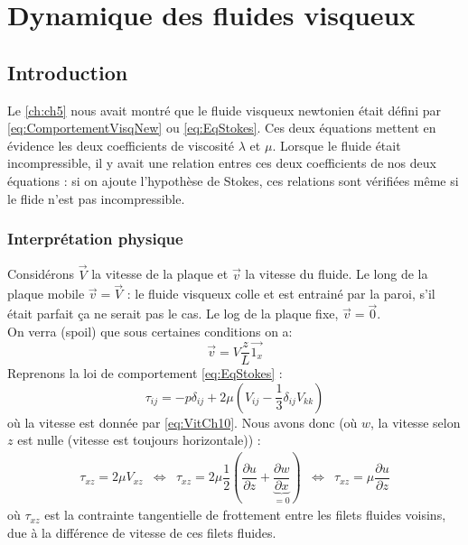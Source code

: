 \chapter{Dynamique des fluides visqueux}
\section{Introduction}
Le \autoref{ch:ch5} nous avait montré que le fluide visqueux newtonien était défini par \autoref{eq:ComportementVisqNew} ou \autoref{eq:EqStokes}. Ces deux équations mettent 
en évidence les deux coefficients de viscosité $\lambda$ et $\mu$. Lorsque le fluide 
était incompressible, il y avait une relation entres ces deux coefficients de nos deux
équations : si on ajoute l'hypothèse de Stokes, ces relations sont vérifiées même si le
flide n'est pas incompressible.


\subsection{Interprétation physique}
Considérons $\vec{V}$ la vitesse de la plaque et $\vec{v}$ la vitesse du fluide. Le
long de la plaque mobile $\vec{v}=\vec{V}$ : le fluide visqueux colle et est entrainé
par la paroi, s'il était parfait ça ne serait pas le cas. Le log de la plaque fixe,
$\vec{v}=\vec{0}$.\\
	
On verra (spoil) que sous certaines conditions on a: 
\begin{equation}
	\vec{v} = V\frac{z}{L}\vec{1_x}
	\label{eq:VitCh10}
\end{equation}
Reprenons la loi de comportement \autoref{eq:EqStokes} :
\begin{equation}
	\tau_{ij} = -p\delta_{ij} + 2\mu\left(V_{ij} - \frac{1}{3}\delta_{ij}V_{kk}\right)
\end{equation}
où la vitesse est donnée par \autoref{eq:VitCh10}. Nous avons donc (où $w$, la vitesse
selon $z$ est nulle (vitesse est toujours horizontale)) :
\begin{equation}
	\begin{array}{ccccc}
		\tau_{xz} = 2\mu V_{xz} & \Leftrightarrow & \tau_{xz} = 2\mu\dfrac{1}{2}\left(\dfrac{ 
		\partial u}{\partial z}+\underbrace{\dfrac{\partial w}{\partial x}}_{=0}\right) &
		\Leftrightarrow & \tau_{xz}	= \mu \dfrac{\partial u}{\partial z}
	\end{array}
\end{equation}
où $\tau_{xz}$ est la contrainte tangentielle de frottement entre les filets fluides
voisins, due à la différence de vitesse de ces filets fluides.
	

